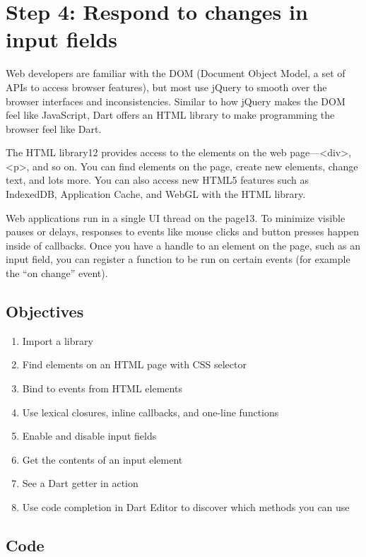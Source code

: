 \section{Step 4: Respond to changes in input fields}

Web developers are familiar with the DOM (Document Object Model, a set of APIs to access browser features), but most use jQuery to smooth over the browser interfaces and inconsistencies. Similar to how jQuery makes the DOM feel like JavaScript, Dart offers an HTML library to make programming the browser feel like Dart.

The HTML library12 provides access to the elements on the web page—<div>, <p>, and so on. You can find elements on the page, create new elements, change text, and lots more. You can also access new HTML5 features such as IndexedDB, Application Cache, and WebGL with the HTML library.

Web applications run in a single UI thread on the page13. To minimize visible pauses or delays, responses to events like mouse clicks and button presses happen inside of callbacks. Once you have a handle to an element on the page, such as an input field, you can register a function to be run on certain events (for example the “on change” event).

\subsection{Objectives}

\begin{enumerate}
\item Import a library
\item Find elements on an HTML page with CSS selector
\item Bind to events from HTML elements
\item Use lexical closures, inline callbacks, and one-line functions
\item Enable and disable input fields
\item Get the contents of an input element
\item See a Dart getter in action
\item Use code completion in Dart Editor to discover which methods you can use
\end{enumerate}

\subsection{Code}

